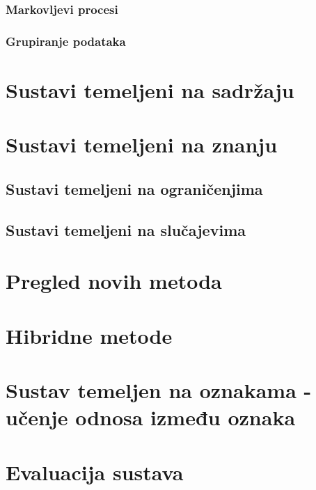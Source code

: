 \documentclass[a4paper,oneside,12pt]{memoir} %
\begin{document}
\subsection{Markovljevi procesi}
%
\subsection{Grupiranje podataka}

\chapter{Sustavi temeljeni na sadržaju}	
\label{ch: sustavi temeljeni na sadrzaju}

\chapter{Sustavi temeljeni na znanju}
\label{ch: sustavi temeljeni na znanju}
\section{Sustavi temeljeni na ograničenjima}
\label{sec: sustavi temeljeni na ogranicenjima}
\section{Sustavi temeljeni na slučajevima}
\label{sec: sustavi temeljeni na slucajevima}

\chapter{Pregled novih metoda}	
\label{ch: pregled novih metode}

\chapter{Hibridne metode}	
\label{ch: hibridne metode}

\chapter{Sustav temeljen na oznakama - učenje odnosa između oznaka}
\label{ch: sustav temeljen na oznakama - ucenje odnosa izmedju oznaka}

\chapter{Evaluacija sustava}	
\label{ch: evalucija sustava}
\end{document}
